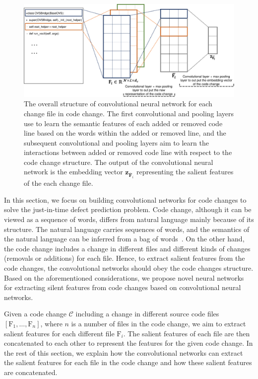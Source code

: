 \begin{figure}
	\center
	\includegraphics[scale=0.25]{figs/code_framework.pdf}
	\caption{The overall structure of convolutional neural network for each change file in code change. The first convolutional and pooling layers use to learn the semantic features of each added or removed code line based on the words within the added or removed line, and the subsequent convolutional and pooling layers aim to learn the interactions between added or removed code line with respect to the code change structure. The output of the convolutional neural network is the embedding vector $\textbf{z}_{\overline{\textbf{F}}_{i}}$ representing the salient features of the each change file.}
	\label{fig:code}
\end{figure}

In this section, we focus on building convolutional networks for code changes to solve the just-in-time defect prediction problem. 
Code change, although it can be viewed as a sequence of words, differs from natural language mainly because of its structure. The natural language carries sequences of words, and the semantics of the natural language can be inferred from a bag of words~\cite{ng1997corpus}. On the other hand, the code change includes a change in different files and different kinds of changes (removals or additions) for each file. Hence, to extract salient features from the code changes, the convolutional networks should obey the code changes structure. 
Based on the aforementioned considerations, we propose novel neural networks for extracting silent features from code changes based on convolutional neural networks. 

Given a code change $\mathcal{C}$ including a change in different source code files $[\text{F}_1, \dots, \text{F}_n]$, where $n$ is a number of files in the code change, we aim to extract salient features for each different file $\text{F}_i$. The salient features of each file are then concatenated to each other to represent the features for the given code change. In the rest of this section, we explain how the convolutional networks can extract the salient features for each file in the code change and how these salient features are concatenated. 

